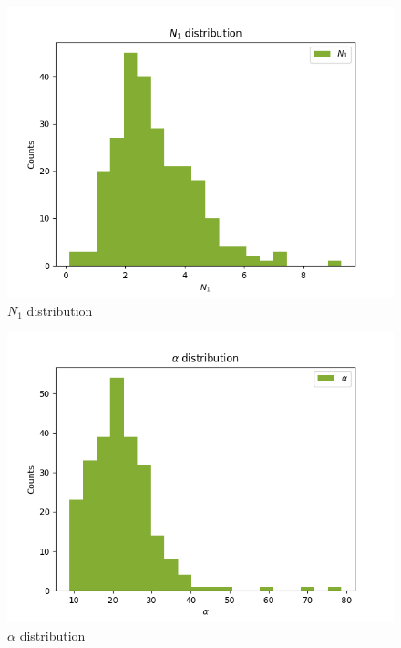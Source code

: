 \documentclass[
]{article}
\begin{document}
\begin{figure}
\centering
\includegraphics{pngplots/param1.png}
\caption{\(N_1\) distribution}
\end{figure}

\begin{figure}
\centering
\includegraphics{pngplots/param2.png}
\caption{\(\alpha\) distribution}
\end{figure}
\end{document}
